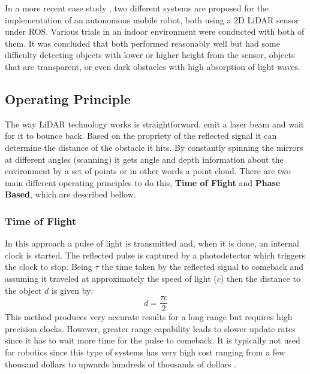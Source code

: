 In a more recent case study \cite{lidar2019ros}, two different systems are proposed for the implementation of an autonomous  mobile robot, both using a 2D \ac{LiDAR} sensor under \ac{ROS}. Various trials in an indoor environment were conducted with both of them. It was concluded that both performed reasonably well but had some difficulty detecting objects with lower or higher height from the sensor, objects that are transparent, or even dark obstacles with high absorption of light waves.  

\subsection{Operating Principle}
The way \ac{LiDAR} technology works is straightforward, emit a laser beam and wait for it to bounce back. Based on the propriety of the reflected signal it can determine the distance of the obstacle it hits. By constantly spinning the mirrors at different angles (scanning) it gets angle and depth information about the environment  by a  set of points or in other words a point cloud. There are two main different operating principles to do this, \textbf{Time of Flight} and \textbf{Phase Based}, which are described bellow.
\subsubsection{Time of Flight}
 In this approach a pulse of light is transmitted and,  when it is done, an internal clock is started. The reflected pulse is captured by a photodetector which triggers the clock to stop. Being $\tau$ the time taken by the reflected signal to  comeback and assuming it traveled at approximately the speed of light ($c$) then the distance to the object $d$ is given by:
\begin{equation}
    d=\frac{\tau c}{2}
\end{equation}
This method produces very accurate results for a long range but requires high precision clocks. However, greater  range capability leads to slower update rates since it has to wait more time for the pulse to comeback.
It is typically not used for robotics since this type of systems has very high cost ranging from a few thousand dollars to upwards hundreds of thousands of dollars \cite{cost}.
